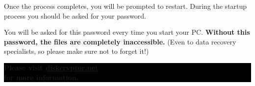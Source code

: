 \documentclass[10.5pt,a4paper]{article}
\begin{document}
\begin{multicols*}{2}
Once the process completes, you will be prompted to restart. During the startup process you should be asked for your password.

You will be asked for this password every time you start your PC. \textbf{Without this password, the files are completely inaccessible.} (Even to data recovery specialists, so please make sure not to forget it!)

\begin{center}
	\vfill %
	\colorbox{Black}{
		\begin{minipage}{8cm}
			\color{white}
			\vspace{0.2cm}
			\begin{center}
				\textbf{{\Large Please visit \url{diskcryptor.net}\\for more information.}}
			\end{center}
			\vspace{0.2cm}
		\end{minipage}
	}
\end{center}

\vspace{0.75cm}

\end{multicols*}
\end{document}
